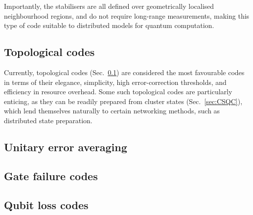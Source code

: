 Importantly, the stabilisers are all defined over geometrically localised neighbourhood regions, and do not require long-range measurements, making this type of code suitable to distributed models for quantum computation.



%
%
%

\subsection{Topological codes} \label{sec:topol_codes} 


Currently, topological codes (Sec.~\ref{sec:topol_codes}) are considered the most favourable codes in terms of their elegance, simplicity, high error-correction thresholds, and efficiency in resource overhead. Some such topological codes are particularly enticing, as they can be readily prepared from cluster states (Sec.~\ref{sec:CSQC}), which lend themselves naturally to certain networking methods, such as distributed state preparation.

%
%

\subsection{Unitary error averaging} \label{sec:error_averaging}




%
%

\subsection{Gate failure codes}



%
%

\subsection{Qubit loss codes}

